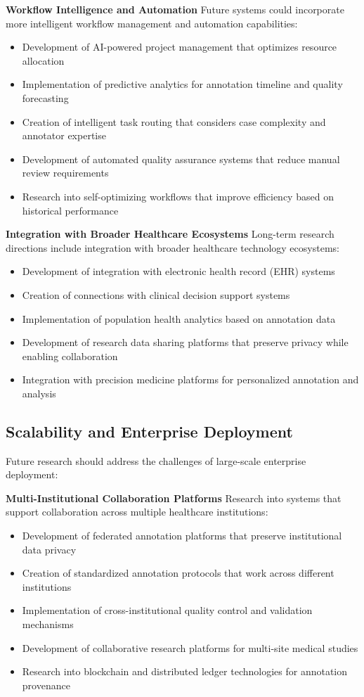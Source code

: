 \textbf{Workflow Intelligence and Automation}
Future systems could incorporate more intelligent workflow management and automation capabilities:

\begin{itemize}
    \item Development of AI-powered project management that optimizes resource allocation
    \item Implementation of predictive analytics for annotation timeline and quality forecasting
    \item Creation of intelligent task routing that considers case complexity and annotator expertise
    \item Development of automated quality assurance systems that reduce manual review requirements
    \item Research into self-optimizing workflows that improve efficiency based on historical performance
\end{itemize}

\textbf{Integration with Broader Healthcare Ecosystems}
Long-term research directions include integration with broader healthcare technology ecosystems:

\begin{itemize}
    \item Development of integration with electronic health record (EHR) systems
    \item Creation of connections with clinical decision support systems
    \item Implementation of population health analytics based on annotation data
    \item Development of research data sharing platforms that preserve privacy while enabling collaboration
    \item Integration with precision medicine platforms for personalized annotation and analysis
\end{itemize}

\subsection{Scalability and Enterprise Deployment}

Future research should address the challenges of large-scale enterprise deployment:

\textbf{Multi-Institutional Collaboration Platforms}
Research into systems that support collaboration across multiple healthcare institutions:

\begin{itemize}
    \item Development of federated annotation platforms that preserve institutional data privacy
    \item Creation of standardized annotation protocols that work across different institutions
    \item Implementation of cross-institutional quality control and validation mechanisms
    \item Development of collaborative research platforms for multi-site medical studies
    \item Research into blockchain and distributed ledger technologies for annotation provenance
\end{itemize}

